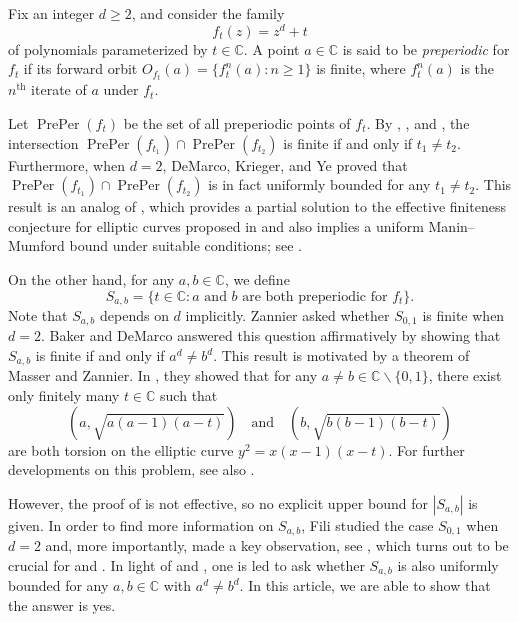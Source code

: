 \documentclass[10pt,a4paper]{amsart}
\numberwithin{equation}{section}
\theoremstyle{plain}
\theoremstyle{definition}
\theoremstyle{remark}
\DeclareMathOperator{\PrePer}{PrePer}
\newcommand{\C}{\mathbb C}
\newcommand{\supth}[1]{\ensuremath{#1^{\mathrm{th}}}}
\begin{document}
Fix an integer $d\geq2$, and consider the family 
\[
f_{t}(z)=z^{d}+t
\]
of polynomials parameterized by $t\in\C$. A
point $a\in\C$ is said to be \textit{preperiodic} for $f_{t}$
if its forward orbit $O_{f_{t}}(a)=\{f_{t}^{n}(a):n\geq1\}$ is finite,
where $f_{t}^{n}(a)$ is the $\supth{n}$ iterate of $a$ under $f_{t}$.

Let $\PrePer(f_{t})$ be the set of all preperiodic points of
$f_{t}$. By \cite[Section 4]{Be}, \cite[Theorem 1.2 and Corollary 1.3]{BD1},
and \cite[Theorem 1.3]{YZ}, the intersection $\PrePer(f_{t_{1}})\cap\PrePer(f_{t_{2}})$
is finite if and only if $t_{1}\neq t_{2}$. Furthermore, when $d=2$,
DeMarco, Krieger, and Ye \cite[Theorem 1.1]{DKY2} proved that $\PrePer(f_{t_{1}})\cap\PrePer(f_{t_{2}})$
is in fact uniformly bounded for any $t_{1}\neq t_{2}$. This result
is an analog of \cite[Theorem 1.4]{DKY1}, which provides a partial
solution to the effective finiteness conjecture for elliptic curves
proposed in \cite{BFT} and also implies a uniform Manin--Mumford
bound under suitable conditions; see \cite[Theorem 1.1]{DKY1}.

On the other hand, for any $a,b\in\C$, we define
\[
S_{a,b}=\{t\in\C:a\text{ and }b\text{ are both preperiodic for }f_{t}\}.
\]
Note that $S_{a,b}$ depends on $d$ implicitly. Zannier \cite[Section 3.4.7]{Za}
asked whether $S_{0,1}$ is finite when $d=2$. Baker and DeMarco
\cite[Theorem 1.1]{BD1} answered this question affirmatively by showing
that $S_{a,b}$ is finite if and only if $a^{d}\neq b^{d}$. This
result is motivated by a theorem of Masser and Zannier. In \cite{MZ1,MZ2,MZ3}, they showed that for any $a\neq b\in\C\backslash\{0,1\}$,
there exist only finitely many $t\in\C$ such that
\[
\left(a,\sqrt{a(a-1)(a-t)}\right)\quad\text{and}\quad\left(b,\sqrt{b(b-1)(b-t)}\right)
\]
are both torsion on the elliptic curve $y^{2}=x(x-1)(x-t)$. For further
developments on this problem, see also \cite{BD2,GHT1,GHT2}.

However, the proof of \cite[Theorem 1.1]{BD1} is not effective, so no
explicit upper bound for $|S_{a,b}|$ is given. In order to find more
information on $S_{a,b}$, Fili \cite{Fi} studied the case $S_{0,1}$
when $d=2$ and, more importantly, made a key observation, see
\cite[Theorem 1]{Fi}, which turns out to be crucial for \cite{DKY1}
and \cite{DKY2}. In light of \cite[Theorem 1.4]{DKY1} and
\cite[Theorem 1.1]{DKY2}, one is led to ask whether $S_{a,b}$ is also
uniformly bounded for any $a,b\in\C$ with $a^{d}\neq b^{d}$. In this
article, we are able to show that the answer is yes.
\end{document}
